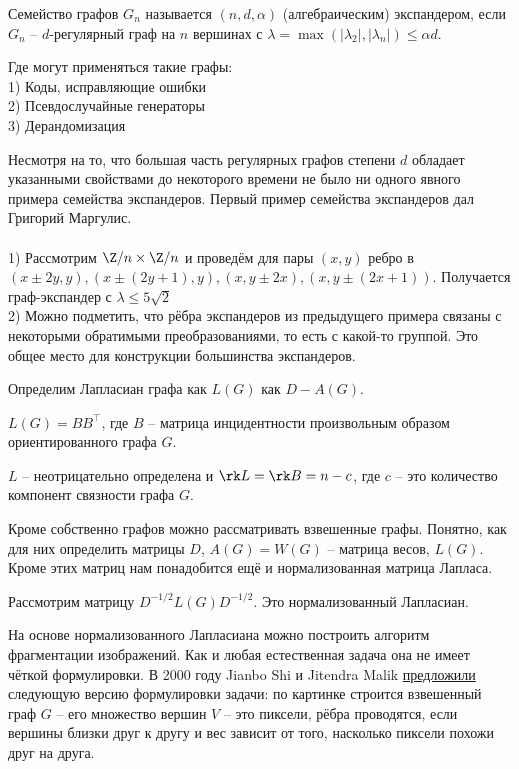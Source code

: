 \dfn Семейство графов $G_n$ называется $(n,d,\alpha)$ (алгебраическим) экспандером, если $G_n$ -- $d$-регулярный граф на $n$ вершинах с $\lambda=\max(|\lambda_2|,|\lambda_n|)\leq \alpha d$.
\edfn

Где могут применяться такие графы:\\
1) Коды, исправляющие ошибки\\
2) Псевдослучайные генераторы\\
3) Дерандомизация

Несмотря на то, что большая часть регулярных графов степени $d$ обладает указанными свойствами  до некоторого времени не было ни одного явного примера семейства экспандеров. Первый пример семейства экспандеров дал Григорий Маргулис. \\


\exm\\
1) Рассмотрим $\Z/n \times \Z/n$ и проведём для пары $(x,y)$ ребро в $(x \pm 2y,y), (x \pm (2y+1),y), (x,y \pm 2x), (x,y \pm (2x+1))$. Получается граф-экспандер с $\lambda \leq 5\sqrt{2}$\\
2) Можно подметить, что рёбра экспандеров из предыдущего примера связаны с некоторыми обратимыми преобразованиями, то есть с какой-то группой. Это общее место для конструкции большинства экспандеров.



\dfn Определим Лапласиан графа как $L(G)$ как $D-A(G)$.
\edfn

\zd $L(G)=B B^\top$, где $B$ -- матрица инцидентности произвольным образом ориентированного графа $G$.
\ezd

\zd $L$ -- неотрицательно определена и  $\rk L= \rk B=n-c$, где $c$ -- это количество компонент связности графа $G$.
\ezd



Кроме собственно графов можно рассматривать взвешенные графы. Понятно, как для них определить матрицы $D$, $A(G)=W(G)$ -- матрица весов, $L(G)$. Кроме этих матриц нам понадобится ещё и нормализованная матрица Лапласа.


\dfn Рассмотрим матрицу $D^{-1/2} L(G) D^{-1/2}$. Это нормализованный Лапласиан.
\edfn

На основе нормализованного Лапласиана можно построить алгоритм фрагментации изображений. Как и любая естественная задача она не имеет чёткой формулировки. В 2000 году Jianbo Shi и  Jitendra Malik \href{https://people.eecs.berkeley.edu/~malik/papers/SM-ncut.pdf}{предложили} следующую версию формулировки задачи: по картинке строится взвешенный граф $G$  -- его множество вершин $V$ -- это пиксели, рёбра проводятся, если вершины близки друг к другу и вес зависит от того, насколько пиксели похожи друг на друга.


